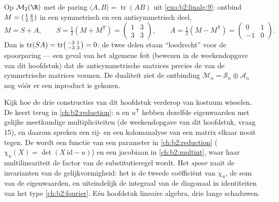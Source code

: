 \begin{example}\label{ex:b2:linalg:tracepairing}
Op $\mathcal{M}_2(\R)$ met de paring $\langle A, B\rangle =
\operatorname{tr}(AB)$ uit \cref{exo:b2:linalg:9}: ontbind $M =
\begin{psmallmatrix}1 & 4\\ 2 & 3\end{psmallmatrix}$ in een
symmetrisch en een antisymmetrisch deel,
\[
M = S + A, \qquad
S = \tfrac12(M + M^{\mathsf T}) =
\begin{pmatrix}1 & 3\\ 3 & 3\end{pmatrix},
\qquad
A = \tfrac12(M - M^{\mathsf T}) =
\begin{pmatrix}0 & 1\\ -1 & 0\end{pmatrix}.
\]
Dan is $\operatorname{tr}(SA) = \operatorname{tr}
\begin{psmallmatrix}-3 & 1\\ -3 & 3\end{psmallmatrix} = 0$: de
twee delen staan ``loodrecht'' voor de spoorparing --- een geval
van het algemene feit (bewezen in de weekendopgave van dit
hoofdstuk) dat de antisymmetrische matrices precies de
 van de symmetrische matrices vormen. De dualiteit ziet de
ontbinding $\mathcal{M}_n = \mathcal{S}_n \oplus \mathcal{A}_n$
nog vóór er een inproduct is gekozen.
\end{example}

\begin{remark}\label{rem:b2:linalg:perspectives}
Kijk hoe de drie constructies van dit hoofdstuk verderop van
kostuum wisselen. De \emph{} keert terug in
\cref{ch:b2:reduction}: $u$ en $u^{\mathsf T}$ hebben dezelfde
eigenwaarden met gelijke meetkundige multipliciteiten (de
weekendopgave van dit hoofdstuk, vraag 15), en daarom spreken een
rij- en een kolomanalyse van een matrix elkaar nooit tegen. De
\emph{} wordt een functie van een parameter in
\cref{ch:b2:reduction} ($\chi_u(X) = \det(X\,\mathrm{id} - u)$) en
een jacobiaan in \cref{ch:b2:multint}, waar haar multilineariteit
de factor van de substitutieregel wordt. Het \emph{spoor} zaait de
invarianten van de gelijkvormigheid: het is de tweede
coëfficiënt van $\chi_u$, de som van de eigenwaarden, en
uiteindelijk de integraal van de diagonaal in identiteiten van het
type \cref{ch:b2:fourier}. Eén hoofdstuk lineaire algebra, drie
lange schaduwen.
\end{remark}

